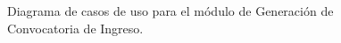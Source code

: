 \begin{figure}[h!]
	\begin{center}
		\caption{Diagrama de casos de uso para el módulo de Generación de Convocatoria de Ingreso. \label{fig:casosUso:generacionConvocatoria}}
	\end{center}
\end{figure}
